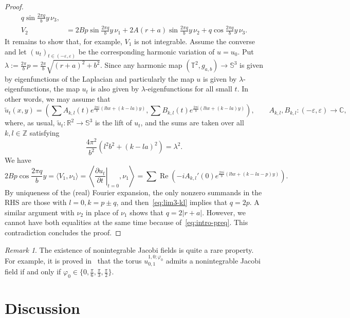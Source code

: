 \documentclass{amsart}
\let\epsilon\varepsilon
\let\phi\varphi
\renewcommand{\Re}{\mathop{\mathrm{Re}}\nolimits}
\theoremstyle{plain}
\theoremstyle{definition}
\theoremstyle{remark}
\newtheorem{remark}{Remark}[section]
\begin{document}
\begin{proof}
\begin{align*}
q\sin\frac{2\pi q}by\,\nu_3,\\
V_2&=2Bp\sin\frac{2\pi q}by\,\nu_1+2A(r+a)\sin\frac{2\pi q}by\,\nu_2+
q\cos\frac{2\pi q}by\,\nu_3.
\end{align*}
It remains to show that, for example, \(V_1\) is not integrable. Assume the
converse and let \((u_t)_{t\in (-\epsilon,\epsilon)}\) be the corresponding
harmonic variation of \(u=u_0\). Put \(\lambda:=\frac{2\pi}b
p=\frac{2\pi}b\sqrt{(r+a)^2+b^2}\). Since any harmonic map \((\mathbb
T^2,g_{a,b})\to\mathbb S^3\) is given by eigenfunctions of the Laplacian and
particularly the map \(u\) is given by \(\lambda\)-eigenfunctions, the map
\(u_t\) is also given by \(\lambda\)-eigenfunctions for all small \(t\). In
other words, we may assume that
\[
\tilde u_t(x,y)=
\left(\sum A_{k,l}(t)e^{\frac{2\pi i}b (lbx+(k-la)y)},
\sum B_{k,l}(t)e^{\frac{2\pi i}b (lbx+(k-la)y)}\right),\qquad
A_{k,l},B_{k,l}\colon (-\epsilon,\epsilon)\to\mathbb C,
\]
where, as usual, \(\tilde u_t\colon\mathbb R^2\to\mathbb S^3\) is the lift of
\(u_t\), and the sums are taken over all \(k,l\in\mathbb Z\) satisfying
\begin{equation}\label{eq:lim3-kl}
\frac{4\pi^2}{b^2}(l^2 b^2+(k-la)^2)=\lambda^2.
\end{equation}
We have
\[
2Bp\cos\frac{2\pi q}by=\langle V_1,\nu_1\rangle=
\left\langle\left.\frac{\partial u_t}{\partial t}\right|_{t=0},\nu_1\right\rangle=
\sum\Re(-iA_{k,l}'(0)e^{\frac{2\pi i}b (lbx+(k-la-p)y)}).
\]
By uniqueness of the (real) Fourier expansion, the only nonzero summands in the
RHS are those with \(l=0,k=p\pm q\), and then~\eqref{eq:lim3-kl} implies that
\(q=2p\). A similar argument with \(\nu_2\) in place of \(\nu_1\) shows that
\(q=2|r+a|\). However, we cannot have both equalities at the same time because
of~\eqref{eq:intro-preq}. This contradiction concludes the proof.
\end{proof}

\begin{remark}
The existence of nonintegrable Jacobi fields is quite a rare property. For
example, it is proved in~\cite{Muk1997} that the torus \(u_{0,1}^{1,0;\phi_0}\)
admits a nonintegrable Jacobi field if and only if
\(\phi_0\in\{0,\frac{\pi}6,\frac{\pi}3,\frac{\pi}2\}\).
\end{remark}

\section{Discussion}\label{sec:disc}
\end{document}
